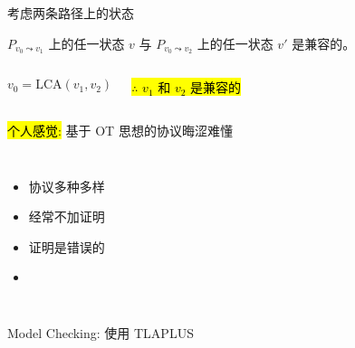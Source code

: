 \begin{frame}{}
  \centerline{ 考虑两条路径上的状态}

  \begin{clemma}
    $P_{v_0 \leadsto v_1}$ 上的任一状态 $v$ 与 $P_{v_0 \leadsto v_2}$ 上的任一状态 $v'$ 是兼容的。
  \end{clemma}

  \begin{columns}
	\[
	  v_0 = \text{LCA}(v_1, v_2)
	\]

	\pause
	\vspace{0.50cm}
	\begin{center}
	  \hl{$\therefore$ $v_1$ 和 $v_2$ 是兼容的}
	\end{center}
  \end{columns}
\end{frame}

\begin{frame}{}
  \centerline{\large \hl{个人感觉:} 基于 OT 思想的协议晦涩难懂}

  \vspace{0.60cm}
  \begin{columns}
      \pause
      \begin{itemize}
	\setlength{\itemsep}{10pt}
	\centering
	\item 协议多种多样
	\item 经常不加证明
	\item 证明是错误的
	\item<3-> \hl{}
      \end{itemize}
  \end{columns}
\end{frame}

\begin{frame}{}
  \centerline{\large Model Checking: 使用 TLAPLUS}

  \begin{columns}
    \pause
  \end{columns}
\end{frame}
